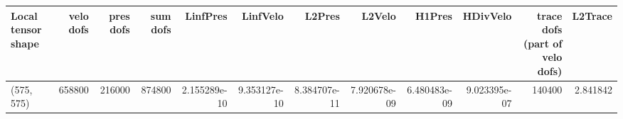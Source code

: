 \begin{tabular}{lrrrrrrrrrrr}
\toprule
Local tensor shape &  velo dofs &  pres dofs &  sum dofs &     LinfPres &     LinfVelo &       L2Pres &       L2Velo &       H1Pres &     HDivVelo &  trace dofs (part of velo dofs) &  L2Trace \\
\midrule
        (575, 575) &     658800 &     216000 &    874800 & 2.155289e-10 & 9.353127e-10 & 8.384707e-11 & 7.920678e-09 & 6.480483e-09 & 9.023395e-07 &                          140400 & 2.841842 \\
\bottomrule
\end{tabular}
